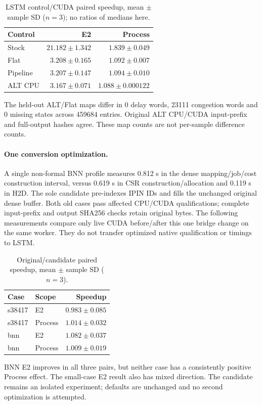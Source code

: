 \documentclass[10pt]{article}
\begin{document}
\begin{table}[h]\centering\small
\caption{LSTM control/CUDA paired speedup, mean $\pm$ sample SD ($n=3$); no ratios of medians here.}
\begin{tabular}{lrr}\toprule Control & E2 & Process\\\midrule
Stock & $21.182\pm1.342$ & $1.839\pm0.049$\\
Flat & $3.208\pm0.165$ & $1.092\pm0.007$\\
Pipeline & $3.207\pm0.147$ & $1.094\pm0.010$\\
ALT CPU & $3.167\pm0.071$ & $1.088\pm0.000122$\\
\bottomrule\end{tabular}\end{table}

The held-out ALT/Flat maps differ in 0 delay words, 23111 congestion words and 0 missing states across 459684 entries. Original ALT CPU/CUDA input-prefix and full-output hashes agree. These map counts are not per-sample difference counts.
\paragraph{One conversion optimization.} A single non-formal BNN profile measures 0.812 s in the dense mapping/job/cost construction interval, versus 0.619 s in CSR construction/allocation and 0.119 s in H2D. The sole candidate pre-indexes IPIN IDs and fills the unchanged original dense buffer. Both old cases pass affected CPU/CUDA qualifications; complete input-prefix and output SHA256 checks retain original bytes. The following measurements compare only live CUDA before/after this one bridge change on the same worker. They do not transfer optimized native qualification or timings to LSTM.

\begin{table}[h]\centering\small
\caption{Original/candidate paired speedup, mean $\pm$ sample SD ($n=3$).}
\begin{tabular}{llr}\toprule Case & Scope & Speedup\\\midrule
s38417 & E2 & $0.983\pm0.085$\\
s38417 & Process & $1.014\pm0.032$\\
bnn & E2 & $1.082\pm0.037$\\
bnn & Process & $1.009\pm0.019$\\
\bottomrule\end{tabular}\end{table}

BNN E2 improves in all three pairs, but neither case has a consistently positive Process effect. The small-case E2 result also has mixed direction. The candidate remains an isolated experiment; defaults are unchanged and no second optimization is attempted.
\end{document}
